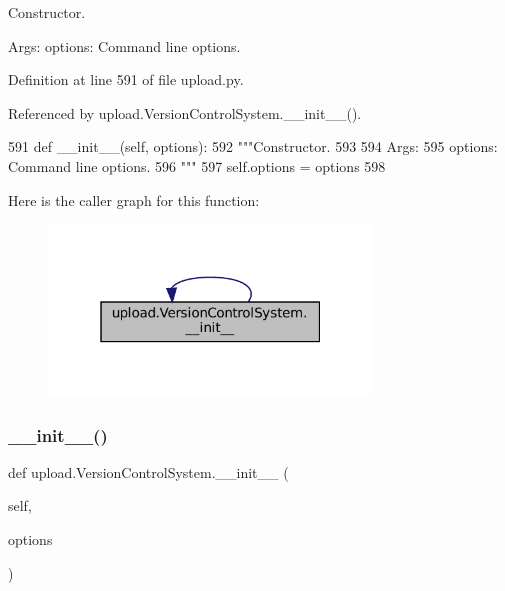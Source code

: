 \begin{DoxyVerb}Constructor.

Args:
  options: Command line options.
\end{DoxyVerb}
 

Definition at line 591 of file upload.\+py.



Referenced by upload.\+Version\+Control\+System.\+\_\+\+\_\+init\+\_\+\+\_\+().


\begin{DoxyCode}
591   \textcolor{keyword}{def }\_\_init\_\_(self, options):
592     \textcolor{stringliteral}{"""Constructor.}
593 \textcolor{stringliteral}{}
594 \textcolor{stringliteral}{    Args:}
595 \textcolor{stringliteral}{      options: Command line options.}
596 \textcolor{stringliteral}{    """}
597     self.options = options
598 
\end{DoxyCode}
Here is the caller graph for this function\+:
\nopagebreak
\begin{figure}[H]
\begin{center}
\leavevmode
\includegraphics[width=244pt]{classupload_1_1VersionControlSystem_ace97e5785a2b40011404ae6fbb956ecf_icgraph}
\end{center}
\end{figure}
\mbox{\label{classupload_1_1VersionControlSystem_ace97e5785a2b40011404ae6fbb956ecf}} 
\subsubsection{\texorpdfstring{\+\_\+\+\_\+init\+\_\+\+\_\+()}{\_\_init\_\_()}\hspace{0.1cm}{\footnotesize\ttfamily [2/2]}}
{\footnotesize\ttfamily def upload.\+Version\+Control\+System.\+\_\+\+\_\+init\+\_\+\+\_\+ (\begin{DoxyParamCaption}\item[{}]{self,  }\item[{}]{options }\end{DoxyParamCaption})}

